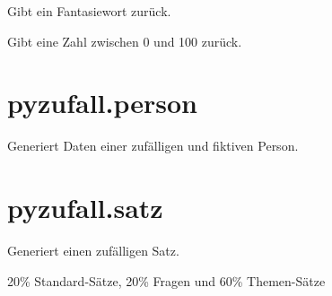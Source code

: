 \documentclass[a4paper,12pt,oneside]{sphinxmanual}
\begin{document}

\begin{fulllineitems}
\label{module:pyzufall.generator.wort}
Gibt ein Fantasiewort zurück.

\end{fulllineitems}


\begin{fulllineitems}
\label{module:pyzufall.generator.zahl}
Gibt eine Zahl zwischen 0 und 100 zurück.

\end{fulllineitems}



\section{pyzufall.person}
\label{module:module-pyzufall.person}\label{module:pyzufall-person}

\begin{fulllineitems}
\label{module:pyzufall.person.Person}
Generiert Daten einer zufälligen und fiktiven Person.

\end{fulllineitems}



\section{pyzufall.satz}
\label{module:module-pyzufall.satz}\label{module:pyzufall-satz}

\begin{fulllineitems}
\label{module:pyzufall.satz.satz}
Generiert einen zufälligen Satz.

20\% Standard-Sätze, 20\% Fragen und 60\% Themen-Sätze

\end{fulllineitems}

\end{document}
